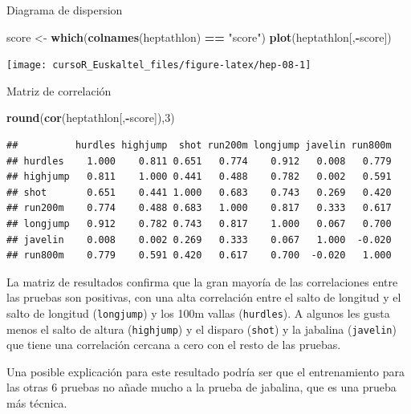 \documentclass[]{book}
\newenvironment{Shaded}{\begin{snugshade}}{\end{snugshade}}
\newcommand{\KeywordTok}[1]{\textcolor[rgb]{0.13,0.29,0.53}{\textbf{#1}}}
\newcommand{\DecValTok}[1]{\textcolor[rgb]{0.00,0.00,0.81}{#1}}
\newcommand{\StringTok}[1]{\textcolor[rgb]{0.31,0.60,0.02}{#1}}
\newcommand{\OperatorTok}[1]{\textcolor[rgb]{0.81,0.36,0.00}{\textbf{#1}}}
\newcommand{\NormalTok}[1]{#1}
\begin{document}
Diagrama de dispersion

\begin{Shaded}
\begin{Highlighting}[]
\NormalTok{score <-}\StringTok{ }\KeywordTok{which}\NormalTok{(}\KeywordTok{colnames}\NormalTok{(heptathlon) }\OperatorTok{==}\StringTok{ "score"}\NormalTok{)}
\KeywordTok{plot}\NormalTok{(heptathlon[,}\OperatorTok{-}\NormalTok{score])}
\end{Highlighting}
\end{Shaded}

\begin{center}\texttt{[image: cursoR\_Euskaltel\_files/figure-latex/hep-08-1]} \end{center}

Matriz de correlación

\begin{Shaded}
\begin{Highlighting}[]
\KeywordTok{round}\NormalTok{(}\KeywordTok{cor}\NormalTok{(heptathlon[,}\OperatorTok{-}\NormalTok{score]),}\DecValTok{3}\NormalTok{)}
\end{Highlighting}
\end{Shaded}

\begin{verbatim}
##          hurdles highjump  shot run200m longjump javelin run800m
## hurdles    1.000    0.811 0.651   0.774    0.912   0.008   0.779
## highjump   0.811    1.000 0.441   0.488    0.782   0.002   0.591
## shot       0.651    0.441 1.000   0.683    0.743   0.269   0.420
## run200m    0.774    0.488 0.683   1.000    0.817   0.333   0.617
## longjump   0.912    0.782 0.743   0.817    1.000   0.067   0.700
## javelin    0.008    0.002 0.269   0.333    0.067   1.000  -0.020
## run800m    0.779    0.591 0.420   0.617    0.700  -0.020   1.000
\end{verbatim}

La matriz de resultados confirma que la gran mayoría de las
correlaciones entre las pruebas son positivas, con una alta correlación
entre el salto de longitud y el salto de longitud (\texttt{longjump}) y
los 100m vallas (\texttt{hurdles}). A algunos les gusta menos el salto
de altura (\texttt{highjump}) y el disparo (\texttt{shot}) y la jabalina
(\texttt{javelin}) que tiene una correlación cercana a cero con el resto
de las pruebas.

Una posible explicación para este resultado podría ser que el
entrenamiento para las otras 6 pruebas no añade mucho a la prueba de
jabalina, que es una prueba más técnica.
\end{document}
